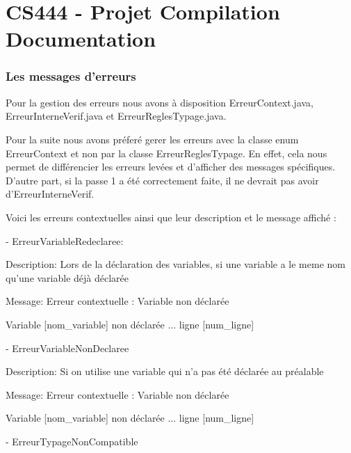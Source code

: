 \part*{CS444 - Projet Compilation \\ Documentation}


\section*{Les messages d'erreurs}

    Pour la gestion des erreurs nous avons à disposition ErreurContext.java,
     ErreurInterneVerif.java et ErreurReglesTypage.java.

     \vspace{3mm}

     Pour la suite nous avons préferé gerer les erreurs avec la classe enum ErreurContext et non par la classe ErreurReglesTypage.
En effet, cela nous permet de différencier les erreurs levées et d'afficher des messages spécifiques.
D'autre part, si la passe 1 a été correctement faite, il ne devrait pas avoir d'ErreurInterneVerif.

    \vspace{3mm}

    Voici les erreurs contextuelles ainsi que leur description et le message affiché :

    \vspace{3mm}

    - ErreurVariableRedeclaree:

    Description: Lors de la déclaration des variables, si une variable a le meme nom qu'une variable déjà déclarée

    Message: Erreur contextuelle : Variable non déclarée

    Variable [nom\_variable] non déclarée ... ligne [num\_ligne]

    \vspace{3mm}

    - ErreurVariableNonDeclaree

    Description: Si on utilise une variable qui n'a pas été déclarée au préalable

    Message: Erreur contextuelle : Variable non déclarée

    Variable [nom\_variable] non déclarée ... ligne [num\_ligne]

    \vspace{3mm}

    - ErreurTypageNonCompatible

